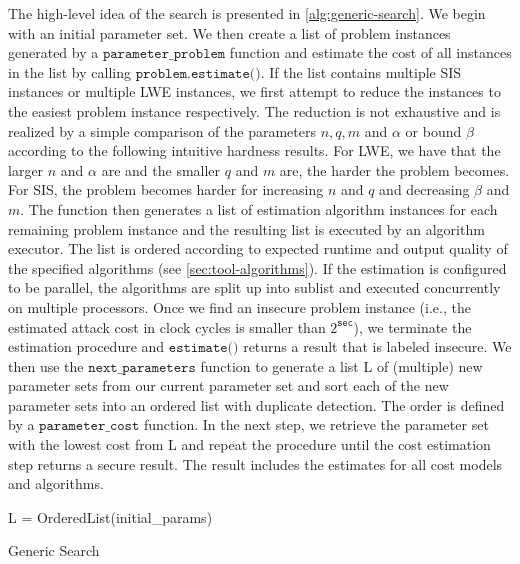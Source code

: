 The high-level idea of the search is presented in \cref{alg:generic-search}. We begin with an initial parameter set. We then create a list of problem instances generated by a $\texttt{parameter\_problem}$ function and estimate the cost of all instances in the list by calling $\texttt{problem.estimate()}$. If the list contains multiple SIS instances or multiple LWE instances, we first attempt to reduce the instances to the easiest problem instance respectively. The reduction is not exhaustive and is realized by a simple comparison of the parameters $n, q, m$ and $\alpha$ or bound $\beta$ according to the following intuitive hardness results. For LWE, we have that the larger $n$ and $\alpha$ are and the smaller $q$ and $m$ are, the harder the problem becomes. For SIS, the problem becomes harder for increasing $n$ and $q$ and decreasing $\beta$ and $m$. The function then generates a list of estimation algorithm instances for each remaining problem instance and the resulting list is executed by an algorithm executor. The list is ordered according to expected runtime and output quality of the specified algorithms (see \cref{sec:tool-algorithms}). If the estimation is configured to be parallel, the algorithms are split up into sublist and executed concurrently on multiple processors.
Once we find an insecure problem instance (i.e., the estimated attack cost in clock cycles is smaller than $2^{\texttt{sec}}$), we terminate the estimation procedure and $\texttt{estimate()}$ returns a result that is labeled insecure. We then use the $\texttt{next\_parameters}$ function to generate a list L of (multiple) new parameter sets from our current parameter set and sort each of the new parameter sets into an ordered list with duplicate detection. The order is defined by a $\texttt{parameter\_cost}$ function. In the next step, we retrieve the parameter set with the lowest cost from L and repeat the procedure until the cost estimation step returns a secure result. The result includes the estimates for all cost models and algorithms.

\begin{algorithm2e}

    L = OrderedList(initial\_params)\\
    \caption{Generic Search} \label{alg:generic-search}
\end{algorithm2e}



